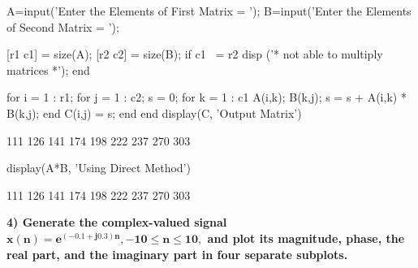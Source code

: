\documentclass[12pt, onecolumn]{IEEEtran}
\begin{document}
	\begin{matlabcode}
		A=input('Enter the Elements of First Matrix = ');
		B=input('Enter the Elements of Second Matrix = ');
		
		[r1 c1] = size(A);
		[r2 c2] = size(B);
		if c1 ~= r2
		disp ('* not able to multiply matrices *');
		end
		
		for i = 1 : r1;
		for j = 1 : c2;
		s = 0;
		for k = 1 : c1
		A(i,k);
		B(k,j);
		s = s + A(i,k) * B(k,j);
		end
		C(i,j) = s;
		end
		end
		display(C, 'Output Matrix')
	\end{matlabcode}
	\begin{matlaboutput}
		111   126   141
		174   198   222
		237   270   303
	\end{matlaboutput}
	\begin{matlabcode}
		
		display(A*B, 'Using Direct Method')
	\end{matlabcode}
	\begin{matlaboutput}
		111   126   141
		174   198   222
		237   270   303
	\end{matlaboutput}
	
	\begin{par}
		\begin{flushleft}
			\textbf{4) Generate the complex-valued signal $ \mathbf{x(n) = e^{(-0.1+j0.3)n}, -10\leq n \leq 10, }$ and plot its magnitude, phase, the real part, and the imaginary part in four separate subplots.}
		\end{flushleft}
	\end{par}
	
\end{document}

